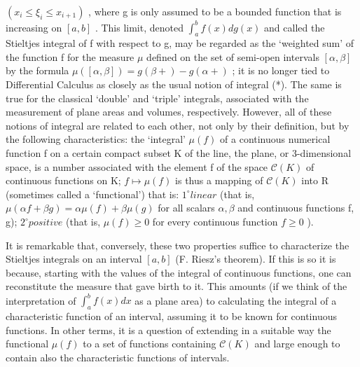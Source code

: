 \((x_{i} \leqslant \xi_{i} \leqslant x_{i+1})\) , where g is only assumed to be a bounded function that is increasing on \([a, b]\) . This limit, denoted \(\int_{a}^{b} f(x) dg(x)\) and called the Stieltjes integral of f with respect to g, may be regarded as the `weighted sum' of the function f for the measure \(\mu\) defined on the set of semi-open intervals \([\alpha, \beta]\) by the formula \(\mu([\alpha, \beta]) = g(\beta+) - g(\alpha+)\) ; it is no longer tied to Differential Calculus as closely as the usual notion of integral (*). The same is true for the classical `double' and `triple' integrals, associated with the measurement of plane areas and volumes, respectively. However, all of these notions of integral are related to each other, not only by their definition, but by the following characteristics: the `integral' \(\mu(f)\) of a continuous numerical function f on a certain compact subset K of the line, the plane, or 3-dimensional space, is a number associated with the element f of the space \(\mathcal{C}(K)\) of continuous functions on K; \(f \mapsto \mu(f)\) is thus a mapping of \(\mathcal{C}(K)\) into R (sometimes called a `functional') that is: \(1^{\circ} linear\) (that is, \(\mu(\alpha f + \beta g) = \alpha \mu(f) + \beta \mu(g)\) for all scalars \(\alpha, \beta\) and continuous functions f, g); \(2^{\circ} positive\) (that is, \(\mu(f) \geqslant 0\) for every continuous function \(f \geqslant 0\) ).

It is remarkable that, conversely, these two properties suffice to characterize the Stieltjes integrals on an interval \([a,b]\) (F. Riesz's theorem). If this is so it is because, starting with the values of the integral of continuous functions, one can reconstitute the measure that gave birth to it. This amounts (if we think of the interpretation of \(\int_{a}^{b}f(x)dx\) as a plane area) to calculating the integral of a characteristic function of an interval, assuming it to be known for continuous functions. In other terms, it is a question of extending in a suitable way the functional \(\mu(f)\) to a set of functions containing \(\mathcal{C}(K)\) and large enough to contain also the characteristic functions of intervals.

